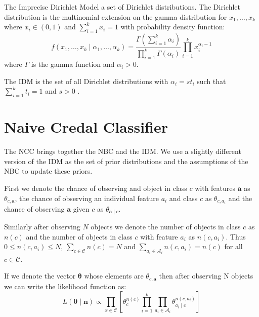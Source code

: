 The Imprecise Dirichlet Model a set of Dirichlet distributions. The Dirichlet distribution is the multinomial extension on the gamma distribution for $x_1,\dots,x_k$ where $x_i \in (0,1)$ and $\sum_{i=1}^k x_i = 1$ with probability density function:
\begin{equation} \label{dirichlet_pdf}
	f(x_1,\dots,x_k \mid \alpha_1,\dots,\alpha_k) = \frac{\Gamma(\sum_{i=1}^k\alpha_i)}{\prod_{i=1}^k\Gamma(\alpha_i)} \prod_{i=1}^k x_i^{\alpha_i - 1}
\end{equation}
where $\Gamma$ is the gamma function and $\alpha_i > 0$.

The IDM is the set of all Dirichlet distributions with $\alpha_i = st_i$ such that $\sum_{i=1}^k t_i = 1$ and $s > 0$ \cite{Walley96}.

\section{Naive Credal Classifier}

The NCC brings together the NBC and the IDM. We use a slightly different version of the IDM as the set of prior distributions and the assumptions of the NBC to update these priors.

First we denote the chance of observing and object in class $c$ with features $\mathbf{a}$ as $\theta_{c,\mathbf{a}}$, the chance of observing an individual feature $a_i$ and class $c$ as $\theta_{c,a_i}$ and the chance of observing $\mathbf{a}$ given $c$ as $\theta_{\mathbf{a} \mid c}$.

Similarly after observing $N$ objects we denote the number of objects in class $c$ as $n(c)$ and the number of objects in class $c$ with feature $a_i$ as $n(c, a_i)$. Thus $0 \leq n(c, a_i) \leq N$, $\sum_{c \in \mathcal{C}} n(c) = N$ and $\sum_{a_i \in \mathcal{A}_i} n(c, a_i) = n(c)$ for all $c \in \mathcal{C}$.

If we denote the vector $\mathbf{\theta}$ whose elements are $\theta_{c,\mathbf{a}}$ then after observing N objects we can write the likelihood function as:
\begin{equation} \label{likelihood}
	L(\mathbf{\theta} \mid \mathbf{n}) \propto \prod_{x \in \mathcal{C}} \left[ \theta_c^{n(c)} \prod_{i=1}^k \prod_{a_i \in \mathcal{A}_i} \theta_{a_i \mid c}^{n(c, a_i)} \right]
\end{equation}

